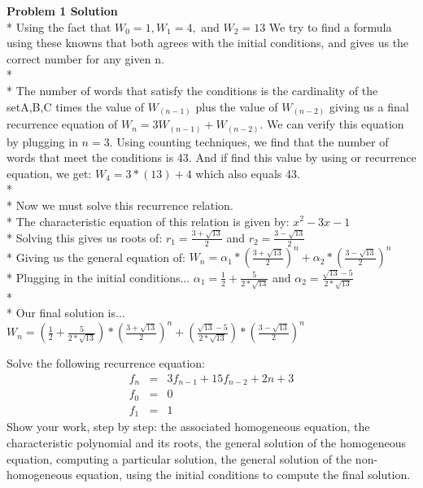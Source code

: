 \documentclass{article}
\begin{document}
\textbf{Problem 1 Solution}
\\*
Using the fact that $W_0 = 1, W_1 = 4,$ and $W_2 = 13$ We try to find a formula using these knowns that both agrees with the initial conditions, and gives us the correct number for any given n.
\\*\\*
The number of words that satisfy the conditions is the cardinality of the set{A,B,C} times the value of $W_(n-1)$ plus the value of $W_(n-2)$ giving us a final recurrence equation of $W_n = 3W_(n-1) + W_(n-2)$. We can verify this equation by plugging in $n = 3$. Using counting techniques, we find that the number of words that meet the conditions is 43. And if find this value by using or recurrence equation, we get: $W_4 = 3*(13) + 4$ which also equals 43. 
\\*\\*
Now we must solve this recurrence relation. 
\\*
The characteristic equation of this relation is given by: $x^2 - 3x -1$
\\*
Solving this gives us roots of: $r_1 = \frac{3+\sqrt{13}}{2}$ and $r_2 = \frac{3-\sqrt{13}}{2}$
\\*
Giving us the general equation of: $W_n = \alpha_1 * (\frac{3+\sqrt{13}}{2})^n + \alpha_2 * (\frac{3-\sqrt{13}}{2})^n$
\\*
Plugging in the initial conditions... $\alpha_1 = \frac{1}{2} + \frac{5}{2*\sqrt{13}}$ and $\alpha_2 = \frac{\sqrt{13}-5}{2*\sqrt{13}}$
\\*\\*
Our final solution is... $W_n = (\frac{1}{2} + \frac{5}{2*\sqrt{13}}) * (\frac{3+\sqrt{13}}{2})^n + (\frac{\sqrt{13}-5}{2*\sqrt{13}}) * (\frac{3-\sqrt{13}}{2})^n$


\begin{problem}
Solve the following recurrence equation:
%
\begin{eqnarray*}
        f_n &=& 3f_{n-1} + 15f_{n-2} + 2n+3\\
        f_0 &=& 0 \\
        f_1 &=& 1
\end{eqnarray*}
%
Show your work, step by step: the associated homogeneous equation,
the characteristic polynomial and its
roots, the general solution of the homogeneous
equation, computing a particular solution,
the general solution of the non-homogeneous equation,
using the initial conditions to compute the final solution.
\end{problem}
\end{document}
